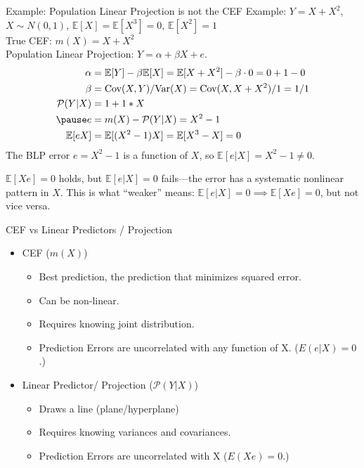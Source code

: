 \documentclass[aspectratio=169, handout, t]{beamer}
\numberwithin{equation}{section}
\begin{document}
\begin{frame}{Example: Population Linear Projection is not the CEF}
Example: $Y=X+X^2$, $X\sim N(0,1)$, $\mathbb{E}[X]=\mathbb{E}[X^3]=0$, $\mathbb{E}[X^2]=1$\\
True CEF: $m(X)=X+X^2$\\
 Population Linear Projection: $Y=\alpha+\beta X+e$.
\begin{align*}
\alpha&=\mathbb{E}[Y]-\beta \mathbb{E}[X]=\mathbb{E}[X+X^2]-\beta\cdot 0=0+1-0\\
\beta&=\text{Cov}(X,Y)/\text{Var}(X)=\text{Cov}(X,X+X^2)/1=1/1\\
\mathcal{P}(Y|X)&=1+1*X\\\pause
e&=m(X)-\mathcal{P}(Y|X)=X^2-1\\
\mathbb{E}[eX]&=\mathbb{E}[(X^2-1)X]=\mathbb{E}[X^3-X]=0
\end{align*}
\pause
The BLP error $e=X^2-1$ is a function of $X$, so $\mathbb{E}[e|X]=X^2-1\neq 0$.

\smallskip
$\mathbb{E}[Xe]=0$ holds, but $\mathbb{E}[e|X]=0$ fails---the error has a systematic nonlinear pattern in $X$.  This is what ``weaker'' means: $\mathbb{E}[e|X]=0 \implies \mathbb{E}[Xe]=0$, but not vice versa.
\end{frame}



\begin{frame}{CEF vs Linear Predictors / Projection}
\begin{itemize}
\item CEF ($m(X)$)
\begin{itemize}
\item Best prediction, the prediction that minimizes squared error.
\item Can be non-linear.
\item Requires knowing joint distribution.
\item Prediction Errors are uncorrelated with any function of X. ($E(e|X)=0$.)
\end{itemize}

\item Linear Predictor/ Projection ($\mathcal{P}(Y|X)$)
\begin{itemize}
\item Draws a line (plane/hyperplane)
\item Requires knowing variances and covariances.
\item Prediction Errors are uncorrelated with X ($E(Xe)=0$.)
\end{itemize}
\end{itemize}
\end{frame}
\end{document}
